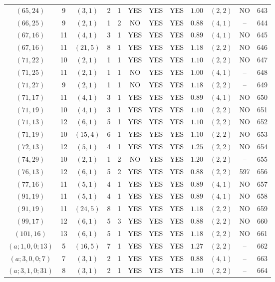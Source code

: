 \begin{longtable}{|c|c|c|c|c|c|c|c|c|c|c|c|}
$(65,24)$ & 9 & $(3,1)$ & 2 & 1 & YES & YES & YES & $1.00$ & $(2,2)$ & NO & 643\\
$(66,25)$ & 9 & $(2,1)$ & 1 & 2 & NO & YES & YES & $0.88$ & $(4,1)$ & -- & 644\\
$(67,16)$ & 11 & $(4,1)$ & 3 & 1 & YES & YES & YES & $0.89$ & $(4,1)$ & NO & 645\\
$(67,16)$ & 11 & $(21,5)$ & 8 & 1 & YES & YES & YES & $1.18$ & $(2,2)$ & NO & 646\\
$(71,22)$ & 10 & $(2,1)$ & 1 & 1 & YES & YES & YES & $1.10$ & $(2,2)$ & NO & 647\\
$(71,25)$ & 11 & $(2,1)$ & 1 & 1 & NO & YES & YES & $1.00$ & $(4,1)$ & -- & 648\\
$(71,27)$ & 9 & $(2,1)$ & 1 & 1 & NO & YES & YES & $1.18$ & $(2,2)$ & -- & 649\\
$(71,17)$ & 11 & $(4,1)$ & 3 & 1 & YES & YES & YES & $0.89$ & $(4,1)$ & NO & 650\\
$(71,19)$ & 10 & $(4,1)$ & 3 & 1 & YES & YES & YES & $1.10$ & $(2,2)$ & NO & 651\\
$(71,13)$ & 12 & $(6,1)$ & 5 & 1 & YES & YES & YES & $1.10$ & $(2,2)$ & NO & 652\\
$(71,19)$ & 10 & $(15,4)$ & 6 & 1 & YES & YES & YES & $1.10$ & $(2,2)$ & NO & 653\\
$(72,13)$ & 12 & $(5,1)$ & 4 & 1 & YES & YES & YES & $1.25$ & $(2,2)$ & NO & 654\\
$(74,29)$ & 10 & $(2,1)$ & 1 & 2 & NO & YES & YES & $1.20$ & $(2,2)$ & -- & 655\\
$(76,13)$ & 12 & $(6,1)$ & 5 & 2 & YES & YES & YES & $0.88$ & $(2,2)$ & 597 & 656\\
$(77,16)$ & 11 & $(5,1)$ & 4 & 1 & YES & YES & YES & $0.89$ & $(4,1)$ & NO & 657\\
$(91,19)$ & 11 & $(5,1)$ & 4 & 1 & YES & YES & YES & $0.89$ & $(4,1)$ & NO & 658\\
$(91,19)$ & 11 & $(24,5)$ & 8 & 1 & YES & YES & YES & $1.18$ & $(2,2)$ & NO & 659\\
$(99,17)$ & 12 & $(6,1)$ & 5 & 3 & YES & YES & YES & $0.88$ & $(2,2)$ & NO & 660\\
$(101,16)$ & 13 & $(6,1)$ & 5 & 1 & YES & YES & YES & $1.18$ & $(2,2)$ & NO & 661\\
$(a;1,0,0;13)$ & 5 & $(16,5)$ & 7 & 1 & YES & YES & YES & $1.27$ & $(2,2)$ & -- & 662\\
$(a;3,0,0;7)$ & 7 & $(3,1)$ & 2 & 1 & YES & YES & YES & $0.88$ & $(4,1)$ & -- & 663\\
$(a;3,1,0;31)$ & 8 & $(3,1)$ & 2 & 1 & YES & YES & YES & $1.10$ & $(2,2)$ & -- & 664\\

\end{longtable}
